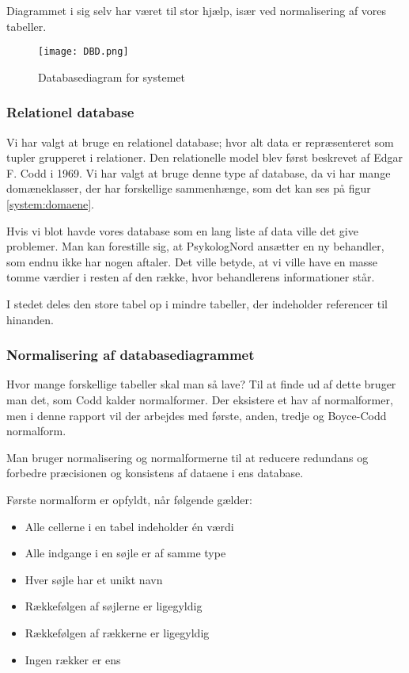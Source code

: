 Diagrammet i sig selv har været til stor hjælp, især ved normalisering af vores tabeller. 

\begin{figure}[H]
    \caption{Databasediagram for systemet}
    \centering
        \texttt{[image: DBD.png]}
    \label{fig:DBD}
\end{figure}

\subsubsection{Relationel database}

Vi har valgt at bruge en relationel database; hvor alt data er repræsenteret som tupler grupperet i relationer.
Den relationelle model blev først beskrevet af Edgar F. Codd i 1969.
Vi har valgt at bruge denne type af database, da vi har mange domæneklasser, der har forskellige sammenhænge, som det kan ses på figur \ref{system:domaene}.

Hvis vi blot havde vores database som en lang liste af data ville det give problemer.
Man kan forestille sig, at PsykologNord ansætter en ny behandler, som endnu ikke har nogen aftaler.
Det ville betyde, at vi ville have en masse tomme værdier i resten af den række, hvor behandlerens informationer står.\cite{database}

I stedet deles den store tabel op i mindre tabeller, der indeholder referencer til hinanden.

\subsubsection{Normalisering af databasediagrammet}

Hvor mange forskellige tabeller skal man så lave? Til at finde ud af dette bruger man det, som Codd kalder normalformer.
Der eksistere et hav af normalformer, men i denne rapport vil der arbejdes med første, anden, tredje og Boyce-Codd normalform.

Man bruger normalisering og normalformerne til at reducere redundans og forbedre præcisionen og konsistens af dataene i ens database.

Første normalform er opfyldt, når følgende gælder:
\begin{itemize}
    \item Alle cellerne i en tabel indeholder én værdi
    \item Alle indgange i en søjle er af samme type
    \item Hver søjle har et unikt navn
    \item Rækkefølgen af søjlerne er ligegyldig
    \item Rækkefølgen af rækkerne er ligegyldig
    \item Ingen rækker er ens
\end{itemize}

